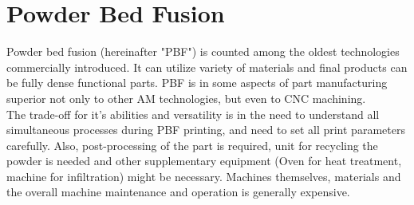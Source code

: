 \documentclass[a4paper, twoside, 11pt]{report}
\begin{document}
\chapter{Powder Bed Fusion}
Powder bed fusion (hereinafter "PBF") is counted among the oldest technologies commercially introduced. It can utilize variety of materials and final products can be fully dense functional parts. PBF is in some aspects of part manufacturing superior not only to other AM technologies, but even to CNC machining.\\
	The trade-off for it's abilities and versatility is in the need to understand all simultaneous processes during PBF printing, and need to set all print parameters carefully. Also, post-processing of the part is required, unit for recycling the powder is needed and other supplementary equipment (Oven for heat treatment, machine for infiltration) might be necessary. Machines themselves, materials and the overall machine maintenance and operation is generally expensive.
\end{document}
